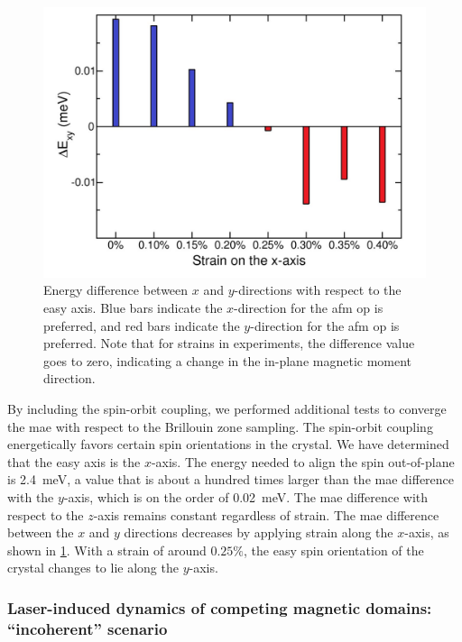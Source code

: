 \begin{figure}
\centering
\includegraphics[width=\textwidth]{./gfx/ch6/equilibriumtheory.pdf}
\caption{
\label{cmb-fig:equilibriumtheory}
Energy difference between $x$ and $y$-directions with respect to the easy axis.
Blue bars indicate the $x$-direction for the \gls{afm} \gls{op} is preferred, and red bars indicate the $y$-direction for the \gls{afm} \gls{op} is preferred.
Note that for strains in experiments, the difference value goes to zero, indicating a change in the in-plane magnetic moment direction.
}
\end{figure}

By including the spin-orbit coupling, we performed additional tests to converge the \gls{mae} with respect to the Brillouin zone sampling.
The spin-orbit coupling energetically favors certain spin orientations in the crystal.
We have determined that the  easy axis is the $x$-axis.
The energy needed to align the spin out-of-plane is \qty{2.4}{meV}, a value that is about a hundred times larger than the \gls{mae} difference with the $y$-axis, which is on the order of \qty{0.02}{meV}.
The \gls{mae} difference with respect  to the $z$-axis remains constant regardless of strain.
The \gls{mae} difference between the $x$ and $y$ directions decreases by applying strain along the $x$-axis, as shown in \cref{cmb-fig:equilibriumtheory}.
With a strain of around $0.25 \%$, the easy spin orientation of the crystal changes to lie along the $y$-axis.

\subsubsection{Laser-induced dynamics of competing magnetic domains: ``incoherent'' scenario}\label{cmb-sec:fluctuations}

